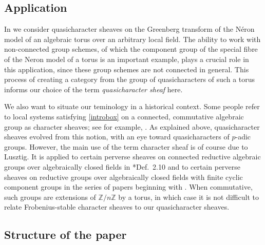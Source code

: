 \documentclass{amsart}
\theoremstyle{plain}
\theoremstyle{definition}
\theoremstyle{remark}
\newcommand{\ZZ}{{\mathbb{Z}}}
\begin{document}
\subsection*{Application}

In \cite{cunningham-roe:13a} we consider quasicharacter sheaves on the
Greenberg transform of the N\'eron model of an algebraic torus over an arbitrary local field.
The ability to work with non-connected group schemes,
of which the component group of the special fibre of the Neron model of a torus is an important example,
plays a crucial role in this application,
since these group schemes are not connected in general.
This process of creating a category from the group of quasicharacters of such a torus
informs our choice of the term \emph{quasicharacter sheaf} here.

We also want to situate our teminology in a historical context.
Some people refer to local systems satisfying \eqref{introbox} on a connected, commutative algebraic group as character sheaves;
see for example, \cite{kamgarpour:09a}.
As explained above, quasicharacter sheaves evolved from this notion,
with an eye toward quasicharacters of $p$-adic groups.
However, the main use of the term character sheaf is of course due to Lusztig.
It is applied to certain perverse sheaves on connected reductive algebraic groups over algebraically closed fields in
\cite{lusztig:85a}*{Def.~2.10} and to certain perverse sheaves on reductive groups
over algebraically closed fields with finite cyclic component groups in the series of papers
beginning with \cite{lusztig:disconnected1}.
When commutative, such groups are extensions of $\ZZ/n\ZZ$ by a torus,
in which case it is not difficult to relate Frobenius-stable character sheaves to our quasicharacter sheaves.

\subsection*{Structure of the paper}
\end{document}
